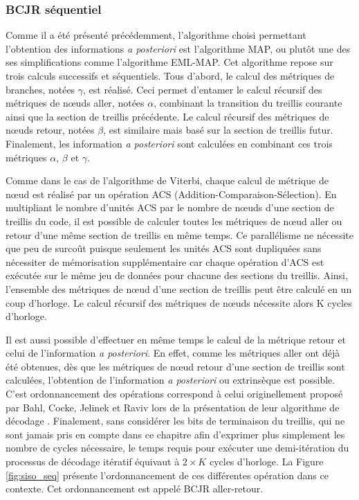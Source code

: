\subsubsection{BCJR séquentiel}
Comme il a été présenté précédemment, l'algorithme choisi permettant l’obtention des informations \textit{a posteriori}
est l'algorithme MAP, ou plutôt une des ses simplifications comme l'algorithme EML-MAP. Cet algorithme repose sur trois
calculs successifs et séquentiels. Tous d'abord, le calcul des métriques de branches, notées $\gamma$, est réalisé. Ceci 
permet d’entamer le calcul récursif des métriques de nœuds aller, notées $\alpha$, combinant la transition du treillis 
courante ainsi que la section de treillis précédente. Le calcul récursif des métriques de nœuds retour, notées $\beta$, 
est similaire mais basé sur 
la section de treillis futur. Finalement, les information \textit{a posteriori} sont 
calculées en combinant ces trois métriques $\alpha$, $\beta$ et $\gamma$. 

Comme dans le cas de l'algorithme de Viterbi, chaque calcul de métrique de nœud est réalisé par un opération ACS 
(Addition-Comparaison-Sélection). En multipliant le
nombre d'unités ACS par le nombre de nœuds d'une section de treillis du code, il est possible de calculer toutes les
métriques de nœud aller ou retour d'une même section de treillis en même temps. Ce parallélisme ne nécessite que peu 
de surcoût puisque seulement les unités ACS sont dupliquées sans nécessiter de mémorisation supplémentaire car chaque 
opération d'ACS est exécutée sur le même jeu de données pour chacune des sections du treillis. Ainsi, l'ensemble des 
métriques de nœud d'une section de treillis peut être calculé en un coup d'horloge. Le calcul récursif des métriques de 
nœuds nécessite alors K cycles d'horloge.

Il est aussi possible d'effectuer en même temps le calcul de la métrique retour et celui de l'information \textit{a 
posteriori}. En effet, comme les métriques aller ont déjà été obtenues, dès que les métriques de nœud retour d'une 
section de treillis sont calculées, l'obtention de l'information \textit{a posteriori} ou extrinsèque est possible.
C'est ordonnancement des opérations correspond à celui originellement proposé par Bahl, Cocke, Jelinek et Raviv lors de 
la présentation de leur algorithme de décodage \cite{bcjr}. 
Finalement, sans considérer les bits de terminaison du treillis, qui ne sont 
jamais pris en compte dans ce chapitre afin d'exprimer plus simplement les nombre de cycles nécessaire, le temps requis 
pour exécuter une demi-itération du processus de décodage
itératif équivaut à $2\times K$ cycles d'horloge. La Figure \ref{fig:siso_seq} présente l'ordonnancement de ces
différentes opération dans ce contexte. Cet ordonnancement est appelé BCJR aller-retour.

